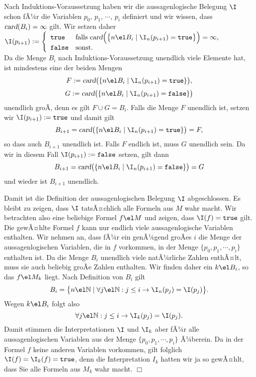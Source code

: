 \begin{enumerate}
     Nach Induktions-Voraussetzung haben wir die aussagenlogische Belegung $\I$ schon fÃ¼r
     die Variablen $p_0$, $p_1$, $\cdots$, $p_i$ definiert und wir wissen, dass
     $\textsl{card}(B_i) = \infty$ gilt.
     Wir setzen daher
      \\[0.1cm]
      \hspace*{1.3cm}      
     $
       \I(p_{i+1}) := \left\{
       \begin{array}[c]{ll}
         \mathtt{true}  & \mbox{falls}\; \textsl{card}\Bigl(\bigl\{ n \el B_i \mid \I_n(p_{i+1}) = \mathtt{true}\bigr\}\Bigr) = \infty, \\
         \mathtt{false} & \mbox{sonst}.
       \end{array}
       \right.
     $
      \\[0.1cm]
      Da die Menge $B_i$ nach Induktions-Voraussetzung unendlich viele Elemente hat, ist
      mindestens eine der beiden Mengen 
     \[ F:=\textsl{card}\bigl(\{ n \el B_i \mid \I_n(p_{i+1}) = \mathtt{true}\}\bigr),\]
     \[G:=\textsl{card}\bigl(\{ n \el B_i \mid \I_n(p_{i+1}) = \mathtt{false}\}\bigr)\]
      unendlich groÃ, denn es gilt $F \cup G = B_i$.  Falls die  Menge $F$ unendlich ist,
      setzen wir $\I(p_{i+1}) := \mathtt{true}$ und damit gilt
      \[ B_{i+1} = \textsl{card}\bigl(\{ n \el B_i \mid \I_n(p_{i+1}) = \mathtt{true}\}\bigr) = F, \]
      so dass auch $B_{i+1}$ unendlich ist.  Falls $F$ endlich ist, muss $G$ unendlich
      sein.  Da wir in diesem Fall $\I(p_{i+1}) := \mathtt{false}$ setzen, gilt dann
       \[ B_{i+1} = \textsl{card}\bigl(\{ n \el B_i \mid \I_n(p_{i+1}) = \mathtt{false}\}\bigr) = G \]
      und wieder ist $B_{i+1}$ unendlich.
\end{enumerate}
Damit ist die Definition der aussagenlogischen Belegung $\I$ abgeschlossen.
Es bleibt zu zeigen, dass $\I$ tatsÃ¤chlich alle Formeln aus $M$ wahr macht.
Wir betrachten also eine beliebige Formel $f\el M$ und zeigen, dass $\I(f) =
\mathtt{true}$ gilt.  Die gewÃ¤hlte Formel $f$ kann nur endlich viele aussagenlogische 
Variablen enthalten.  Wir nehmen an, dass fÃ¼r ein genÃ¼gend groÃes $i$ 
die Menge der aussagenlogischen Variablen, die in $f$ vorkommen, in der Menge
$\{p_0,p_1,\cdots,p_i\}$ enthalten ist.
Da die Menge $B_i$ unendlich viele natÃ¼rliche Zahlen enthÃ¤lt, muss sie auch beliebig groÃe
Zahlen enthalten.  
Wir finden daher ein $k \el B_i$, so das $f \el M_k$ liegt.
Nach Definition von $B_i$ gilt 
\[ B_i = \bigl\{ n \el \mathbb{N} \mid 
                \forall j \el \mathbb{N} : j \leq i \rightarrow \I_n(p_j) = \I(p_j)  \bigr\}.
\]
Wegen $k \el B_i$ folgt also
\[ \forall j \el \mathbb{N} : j \leq i \rightarrow \I_k(p_j) = \I(p_j). \]
Damit stimmen die Interpretationen $\I$ und $\I_k$ aber fÃ¼r alle aussagenlogischen
Variablen aus der Menge 
$\{p_0,p_1,\cdots,p_i\}$ Ã¼berein.  Da in der Formel $f$ keine anderen Variablen vorkommen,
gilt folglich $\I(f) = \I_k(f) = \mathtt{true}$, denn die Interpretation $I_k$ hatten wir
ja so gewÃ¤hlt, dass Sie alle Formeln aus $M_k$ wahr macht.
\hspace*{\fill} $\Box$
\vspace*{0.3cm}

